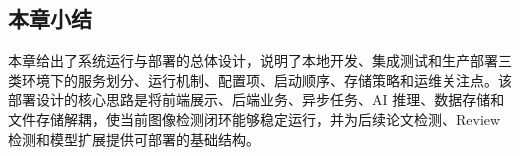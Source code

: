 \subsection{本章小结}
本章给出了系统运行与部署的总体设计，说明了本地开发、集成测试和生产部署三类环境下的服务划分、运行机制、配置项、启动顺序、存储策略和运维关注点。该部署设计的核心思路是将前端展示、后端业务、异步任务、AI 推理、数据存储和文件存储解耦，使当前图像检测闭环能够稳定运行，并为后续论文检测、Review 检测和模型扩展提供可部署的基础结构。
